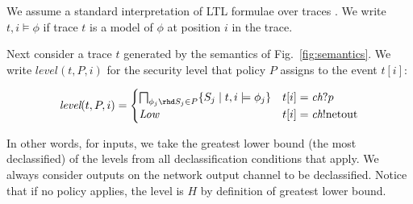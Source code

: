 \documentclass[10pt,conference,compsocconf]{IEEEtran}
\newcommand{\code}[1]{\text{\lstinline!#1!}}
\newcommand{\aset}[1]{\{#1\}}
\newcommand{\sch}{\textit{ch}}
\newcommand{\tr}{t\xspace}
\newcommand{\tfuture}{\mathcal{F}}
\newcommand{\tlevel}[3]{\textit{level}(#1, #2, #3)}
\begin{document}



We assume a standard interpretation of LTL formulae over
traces \cite{Lichtenstein:85}.
We write $\tr, i \models \phi$ if trace $\tr$ is a model of $\phi$ at
position $i$ in the trace.

Next consider a trace $\tr$ generated by the semantics of
Fig.~\ref{fig:semantics}. We write $\tlevel{\tr}{P}{i}$ for the
security level that policy $P$ assigns to the event $\tr[i]$:

\begin{displaymath}
  \tlevel{\tr}{P}{i} =
  \begin{cases}
    \bigsqcap_{\phi_j\rhd S_j \in P} \aset{ S_j \mid \tr, i \models
      \phi_j } & \tr[i] = \sch?p \\
    \textit{Low} & \tr[i] = \sch!\code{netout} \\
  \end{cases}
\end{displaymath}

In other words, for inputs, we take the greatest lower bound (the most
declassified) of the levels from all declassification conditions that
apply. We always consider outputs on the network output channel to be
declassified. Notice that if no policy applies, the level is $H$ by
definition of greatest lower bound.
\end{document}

